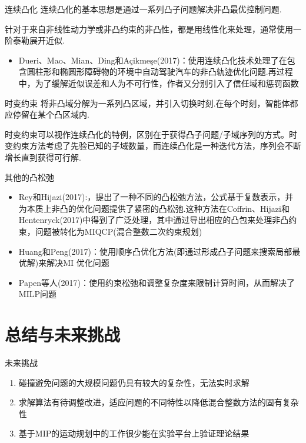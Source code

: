 \documentclass[notheorems,11pt]{beamer}
\theoremstyle{plain}
\numberwithin{theorem}{section}
\numberwithin{lemma}{section}
\numberwithin{corollary}{section}
\theoremstyle{example}
\begin{document}
\begin{frame}{连续凸化}
  连续凸化的基本思想是通过一系列凸子问题解决非凸最优控制问题.\par
  针对于来自非线性动力学或非凸约束的非凸性，都是用线性化来处理，通常使用一阶泰勒展开近似.
  \begin{itemize}
    \item Dueri、Mao、Mian、Ding和Açikmeşe(2017)：使用连续凸化技术处理了在包含圆柱形和椭圆形障碍物的环境中自动驾驶汽车的非凸轨迹优化问题.再过程中，为了缓解近似误差和人为不可行性，作者又分别引入了信任域和惩罚函数
  \end{itemize}
\end{frame}

\begin{frame}{时变约束}
  将非凸域分解为一系列凸区域，并引入切换时刻.在每个时刻，智能体都应停留在某个凸区域内.\par
  时变约束可以视作连续凸化的特例，区别在于获得凸子问题/子域序列的方式。时变约束方法考虑了先验已知的子域数量，而连续凸化是一种迭代方法，序列会不断增长直到获得可行解.
\end{frame}

\begin{frame}{其他的凸松弛}
  \begin{itemize}
    \item Rey和Hijazi(2017):，提出了一种不同的凸松弛方法，公式基于复数表示，并为本质上非凸的优化问题提供了紧密的凸松弛.这种方法在Coffrin、Hijazi和Hentenryck(2017)中得到了广泛处理，其中通过导出相应的凸包来处理非凸约束，问题被转化为MIQCP(混合整数二次约束规划)
    \item Huang和Peng(2017)：使用顺序凸优化方法(即通过形成凸子问题来搜索局部最优解)来解决MI 优化问题
    \item Papen等人(2017)：使用约束松弛和调整复杂度来限制计算时间，从而解决了MILP问题
  \end{itemize}
\end{frame}

\section{总结与未来挑战}

\begin{frame}{未来挑战}
  \begin{enumerate}
    \item 碰撞避免问题的大规模问题仍具有较大的复杂性，无法实时求解
    \item 求解算法有待调整改进，适应问题的不同特性以降低混合整数方法的固有复杂性
    \item 基于MIP的运动规划中的工作很少能在实验平台上验证理论结果
  \end{enumerate}
\end{frame}
\end{document}
